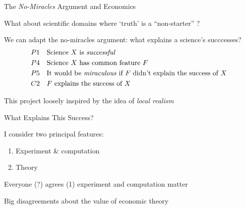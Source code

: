 \documentclass[aspectratio=169,xcolor=dvipsnames]{beamer}
\begin{document}
\begin{frame}{The \textit{No-Miracles} Argument and Economics}

What about scientific domains where `truth' is a ``non-starter'' \autocite[328]{alexandrova2009}?

\vspace{5mm}
We can adapt the no-miracles argument: what explains a science's succcesses?
\begin{align*}
    & P1 \quad \text{Science $X$ is \textit{successful}} \\
    & P4 \quad \text{Science $X$ has common feature $F$} \\
    & P5 \quad \text{It would be \textit{miraculous} if $F$ didn't explain the success of $X$} \\
    & C2 \quad \text{$F$ explains the success of $X$}
\end{align*}

This project loosely inspired by the idea of \textit{local realism} \autocite{maki2009}

\end{frame}








\begin{frame}{What Explains This Success?}

I consider two principal features:
\begin{enumerate}
    \item Experiment \& computation
    \item Theory
\end{enumerate}

\vspace{5mm}
Everyone (?) agrees (1) experiment and computation matter

\vspace{5mm}
Big disagreements about the value of economic theory

\end{frame}
\end{document}
